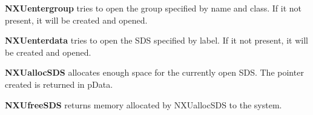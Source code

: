 \documentclass[12pt]{article}
\begin{document}
 {\bf NXUentergroup} tries to open the group specified by name and class.
 If it not present, it will be created and opened.

 {\bf NXUenterdata} tries to open the SDS specified by label.
 If it not present, it will be created and opened.

  {\bf NXUallocSDS} allocates enough space for the currently open SDS. The
  pointer created is returned in pData. 

  {\bf NXUfreeSDS} returns memory allocated by NXUallocSDS to the system.
\end{document}

